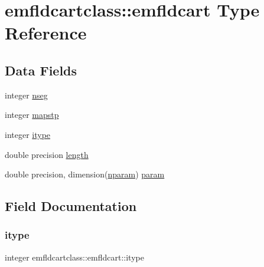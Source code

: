 \hypertarget{structemfldcartclass_1_1emfldcart}{}\section{emfldcartclass\+::emfldcart Type Reference}
\label{structemfldcartclass_1_1emfldcart}
\subsection*{Data Fields}
\begin{DoxyCompactItemize}
\item 
integer \mbox{\hyperlink{structemfldcartclass_1_1emfldcart_acf5b75cb340cfc6f837318ed47038f25}{nseg}}
\item 
integer \mbox{\hyperlink{structemfldcartclass_1_1emfldcart_af80bf92550bb63b5f809ab3be6bbfe8d}{mapstp}}
\item 
integer \mbox{\hyperlink{structemfldcartclass_1_1emfldcart_a9ea1ffbf61d29a3520ad743300cfce15}{itype}}
\item 
double precision \mbox{\hyperlink{structemfldcartclass_1_1emfldcart_aa2c152d23138df1a44c6ff50407ac04d}{length}}
\item 
double precision, dimension(\mbox{\hyperlink{namespaceemfldcartclass_a72ee7da1adbf56a707b72607da000549}{nparam}}) \mbox{\hyperlink{structemfldcartclass_1_1emfldcart_a72ab84a2cacd1906ab51cb7a6637956e}{param}}
\end{DoxyCompactItemize}


\subsection{Field Documentation}
\mbox{\label{structemfldcartclass_1_1emfldcart_a9ea1ffbf61d29a3520ad743300cfce15}} 
\subsubsection{\texorpdfstring{itype}{itype}}
{\footnotesize\ttfamily integer emfldcartclass\+::emfldcart\+::itype}

\mbox{\label{structemfldcartclass_1_1emfldcart_aa2c152d23138df1a44c6ff50407ac04d}} 
